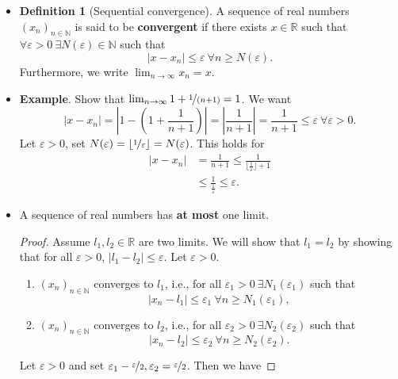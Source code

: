 \documentclass{article}
\newcommand{\R}{\mathbb{R}}
\newcommand{\N}{\mathbb{N}}
\newcommand{\seq}[2]{(#1_{#2})_{#2 \in \N}}
\newcommand{\?}{\stackrel{?}{=}}
\theoremstyle{definition} %
\newtheorem{definition}[theorem]{Definition} %
\begin{document}
\begin{itemize}
    \item[]
          \begin{definition}[Sequential convergence]
              A sequence of real numbers $\seq{x}{n}$ is said to be \textbf{convergent} if there exists $x \in \R$ such that $\forall \varepsilon > 0 \ \exists N(\varepsilon) \in \N$ such that
              $$|x - x_n| \leq \varepsilon \ \forall n \geq N(\varepsilon).$$
              Furthermore, we write $\lim_{n \to \infty} x_n = x$.
          \end{definition}
    \item \textbf{Example}. Show that $\lim_{n \to \infty} 1 + \nicefrac{1}{(n + 1)} = 1$. We want
          $$|x - x_n| = \left|1 - \left(1 + \frac{1}{n + 1}\right)\right| = \left|\frac{1}{n + 1}\right| = \frac{1}{n + 1} \leq \varepsilon \ \forall \varepsilon > 0.$$
          Let $\varepsilon > 0$, set $N(\varepsilon) = \lfloor \nicefrac{1}{\varepsilon} \rfloor = N(\varepsilon)$. This holds for
          \begin{align*}
              |x - x_n| & = \frac{1}{n + 1} \leq \frac{1}{\lfloor \frac{1}{\varepsilon} \rfloor + 1} \\
                        & \leq \frac{1}{\frac{1}{\varepsilon}} \leq \varepsilon.
          \end{align*}
    \item[]
          \begin{lemma}
              A sequence of real numbers has \textbf{at most} one limit.
          \end{lemma}
          \begin{proof}
              Assume $l_1, l_2 \in \R$ are two limits. We will show that $l_1 = l_2$ by showing that for all $\varepsilon > 0$, $|l_1 - l_2| \leq \varepsilon$. Let $\varepsilon > 0$.
              \begin{enumerate}[label=(\arabic*)]
                  \item $\seq{x}{n}$ converges to $l_1$, i.e., for all $\varepsilon_1 > 0 \ \exists N_1(\varepsilon_1)$ such that
                        $$|x_n - l_1| \leq \varepsilon_1 \ \forall n \geq N_1(\varepsilon_1),$$
                  \item $\seq{x}{n}$ converges to $l_2$, i.e., for all $\varepsilon_2 > 0 \ \exists N_2(\varepsilon_2)$ such that
                        $$|x_n - l_2| \leq \varepsilon_2 \ \forall n \geq N_2(\varepsilon_2).$$
              \end{enumerate}
              Let $\varepsilon > 0$ and set $\varepsilon_1 - \nicefrac{\varepsilon}{2}, \varepsilon_2 = \nicefrac{\varepsilon}{2}$. Then we have

\end{proof}
\end{itemize}
\end{document}
